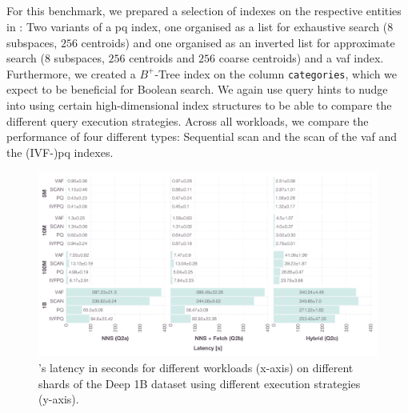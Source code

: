 \subsection{\cottontail}
\label{section:evaluation_bignns_cottontail}
For this benchmark, we prepared a selection of indexes on the respective entities in \cottontail{}: Two variants of a \acrshort{pq} index, one organised as a list for exhaustive search ($8$ subspaces, $256$ centroids) and one organised as an inverted list for approximate search ($8$ subspaces, $256$ centroids and $256$ coarse centroids) and a \acrshort{vaf} index. Furthermore, we created a $B^{+}$-Tree index on the column \texttt{categories}, which we expect to be beneficial for Boolean search. We again use query hints to nudge \cottontail{} into using certain high-dimensional index structures to be able to compare the different query execution strategies. Across all workloads, we compare the performance of four different types: Sequential scan and the scan of the \acrshort{vaf} and the (IVF-)\acrshort{pq} indexes.

\begin{landscape}
    \begin{figure}[p]
        \centering
        \includegraphics[width=1.55\textwidth]{figures/bignns/cottontail/bignns-cottontail-runtime}
        \caption {\cottontail{}'s latency in seconds for different workloads (x-axis) on different shards of the Deep 1B dataset using different execution strategies (y-axis).}
        \label{figure:cottontail_runtime}
    \end{figure}
\end{landscape}

